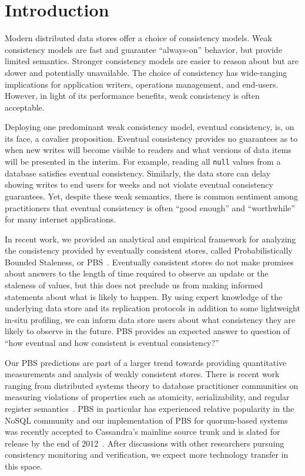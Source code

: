 \section{Introduction}

Modern distributed data stores offer a choice of consistency
models. Weak consistency models are fast and guarantee ``always-on''
behavior, but provide limited semantics. Stronger consistency models
are easier to reason about but are slower and potentially
unavailable. The choice of consistency has wide-ranging implications
for application writers, operations management, and
end-users. However, in light of its performance benefits, weak
consistency is often acceptable.

Deploying one predominant weak consistency model, eventual
consistency, is, on its face, a cavalier proposition. Eventual
consistency provides no guarantees as to when new writes will become
visible to readers and what versions of data items will be presented
in the interim. For example, reading all \texttt{null} values from a
database satisfies eventual consistency. Similarly, the data store can
delay showing writes to end users for weeks and not violate eventual
consistency guarantees. Yet, despite these weak semantics, there is
common sentiment among practitioners that eventual consistency is
often ``good enough'' and ``worthwhile'' for many
internet applications.

In recent work, we provided an analytical and empirical framework for
analyzing the consistency provided by eventually consistent stores,
called Probabilistically Bounded Staleness, or
PBS~\cite{pbs-vldb2012}. Eventually consistent stores do not make promises
about answers to the length of time required to observe an update or
the staleness of values, but this does not preclude us from making
informed statements about what is likely to happen. By using expert
knowledge of the underlying data store and its replication protocols
in addition to some lightweight in-situ profiling, we can inform data
store users about what consistency they are likely to observe in the
future. PBS provides an expected answer to question of ``how eventual
and how consistent is eventual consistency?''

Our PBS predictions are part of a larger trend towards providing
quantitative measurements and analysis of weakly consistent
stores. There is recent work ranging from distributed systems theory
to database practitioner communities on measuring violations of
properties such as atomicity, serializability, and regular register
semantics~\cite{hotdep}. PBS in particular has experienced relative
popularity in the NoSQL community and our implementation of PBS for
quorum-based systems was recently accepted to Cassandra's mainline
source trunk and is slated for release by the end of
2012~\cite{cassandra-pbs-patch}. After discussions with other
researchers pursuing consistency monitoring and verification, we
expect more technology transfer in this space.

